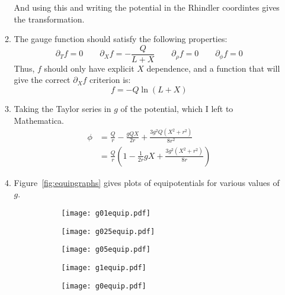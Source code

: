 \documentclass[12pt,a4]{article}
\begin{document}
\begin{enumerate}
\begin{enumerate}
        And using this and writing the potential in the Rhindler coordintes gives the transformation.
      \item
        The gauge function should satisfy the following properties:
        \begin{equation*}
          \partial_T f = 0 \qquad \partial_X f = -\frac{Q}{L + X} \qquad \partial_\rho f = 0 \qquad \partial_\phi f = 0
        \end{equation*}
        Thus, $f$ should only have explicit $X$ dependence, and a function that will give the correct $\partial_X f$ criterion is:
        \begin{equation*}
          f = - Q \ln(L + X)
        \end{equation*}
      \item
        Taking the Taylor series in $g$ of the potential, which I left to Mathematica.
        \begin{align*}
          \phi &= \frac{Q}{r} -\frac{g Q X}{2 r}+ \frac{3 g ^2Q (X^2+r^2) }{8 r^2}\\
               &= \frac{Q}{r}\left(1 -\frac{1}{2 r}gX+ \frac{3 g ^2 (X^2+r^2) }{8 r}\right)
        \end{align*}
      \item
        Figure~\ref{fig:equipgraphs} gives plots of equipotentials for various values of $g$.
        \begin{figure}[H]
          \centering
          \begin{subfigure}[a]{.4\textwidth}
            \texttt{[image: g01equip.pdf]}
          \end{subfigure}
          \begin{subfigure}[a]{.4\textwidth}
            \texttt{[image: g025equip.pdf]}
          \end{subfigure}
          \begin{subfigure}[a]{.4\textwidth}
            \texttt{[image: g05equip.pdf]}
          \end{subfigure}
          \begin{subfigure}[a]{.4\textwidth}
            \texttt{[image: g1equip.pdf]}
          \end{subfigure}
          \begin{subfigure}[a]{.4\textwidth}
            \texttt{[image: g0equip.pdf]}
          \end{subfigure}

\end{figure}
\end{enumerate}
\end{enumerate}
\end{document}
